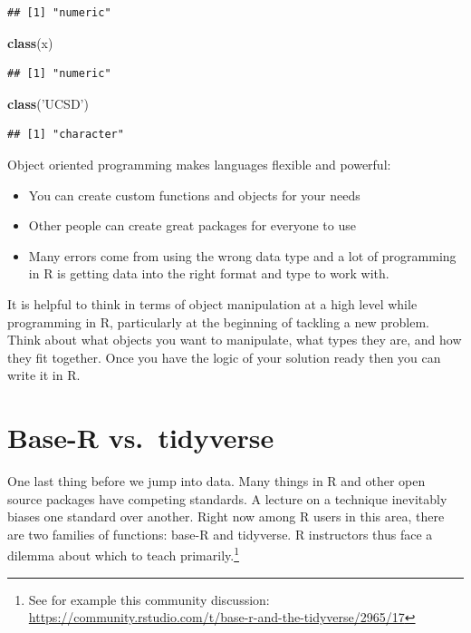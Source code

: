 \documentclass[
]{book}
\newenvironment{Shaded}{\begin{snugshade}}{\end{snugshade}}
\newcommand{\KeywordTok}[1]{\textcolor[rgb]{0.13,0.29,0.53}{\textbf{#1}}}
\newcommand{\NormalTok}[1]{#1}
\newcommand{\StringTok}[1]{\textcolor[rgb]{0.31,0.60,0.02}{#1}}
\providecommand{\tightlist}{%
  \setlength{\itemsep}{0pt}\setlength{\parskip}{0pt}}
\theoremstyle{definition}
\theoremstyle{definition}
\theoremstyle{definition}
\theoremstyle{definition}
\theoremstyle{remark}
\begin{document}
\begin{verbatim}
## [1] "numeric"
\end{verbatim}

\begin{Shaded}
\begin{Highlighting}[]
\KeywordTok{class}\NormalTok{(x)}
\end{Highlighting}
\end{Shaded}

\begin{verbatim}
## [1] "numeric"
\end{verbatim}

\begin{Shaded}
\begin{Highlighting}[]
\KeywordTok{class}\NormalTok{(}\StringTok{'UCSD'}\NormalTok{)}
\end{Highlighting}
\end{Shaded}

\begin{verbatim}
## [1] "character"
\end{verbatim}

Object oriented programming makes languages flexible and powerful:

\begin{itemize}
\tightlist
\item
  You can create custom functions and objects for your needs
\item
  Other people can create great packages for everyone to use
\item
  Many errors come from using the wrong data type and a lot of programming in R is getting data into the right format and type to work with.
\end{itemize}

It is helpful to think in terms of object manipulation at a high level while programming in R, particularly at the beginning of tackling a new problem. Think about what objects you want to manipulate, what types they are, and how they fit together. Once you have the logic of your solution ready then you can write it in R.

\hypertarget{base-r-vs.-tidyverse}{%
\section{Base-R vs.~tidyverse}\label{base-r-vs.-tidyverse}}

One last thing before we jump into data. Many things in R and other open source packages have competing standards. A lecture on a technique inevitably biases one standard over another. Right now among R users in this area, there are two families of functions: base-R and tidyverse. R instructors thus face a dilemma about which to teach primarily.\footnote{See for example this community discussion: \url{https://community.rstudio.com/t/base-r-and-the-tidyverse/2965/17}}
\end{document}
